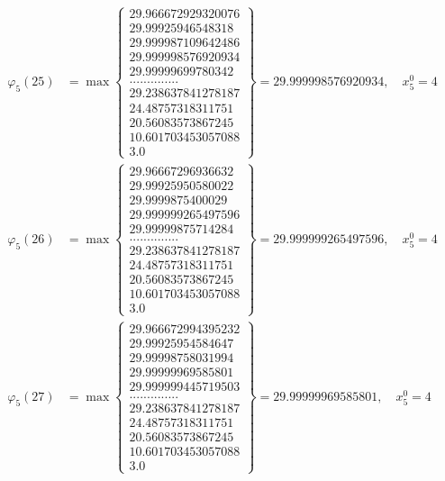 \documentclass{article}
\begin{document}
\begin{align*}
  
  
  
\varphi_{5}(25) &= \max \left\{ \begin{array}{c}
29.966672929320076 \\
 29.99925946548318 \\
 29.999987109642486 \\
 29.999998576920934 \\
 29.99999699780342 \\
 .............. \\
 29.238637841278187 \\
 24.48757318311751 \\
 20.56083573867245 \\
 10.601703453057088 \\
 3.0
\end{array} \right\} = 29.999998576920934, \quad x_{5}^0 = 4\\
  
  
  
  
\varphi_{5}(26) &= \max \left\{ \begin{array}{c}
29.96667296936632 \\
 29.99925950580022 \\
 29.9999875400029 \\
 29.999999265497596 \\
 29.99999875714284 \\
 .............. \\
 29.238637841278187 \\
 24.48757318311751 \\
 20.56083573867245 \\
 10.601703453057088 \\
 3.0
\end{array} \right\} = 29.999999265497596, \quad x_{5}^0 = 4\\
  
  
  
  
\varphi_{5}(27) &= \max \left\{ \begin{array}{c}
29.966672994395232 \\
 29.99925954584647 \\
 29.99998758031994 \\
 29.99999969585801 \\
 29.999999445719503 \\
 .............. \\
 29.238637841278187 \\
 24.48757318311751 \\
 20.56083573867245 \\
 10.601703453057088 \\
 3.0
\end{array} \right\} = 29.99999969585801, \quad x_{5}^0 = 4\\
  

\end{align*}
\end{document}
